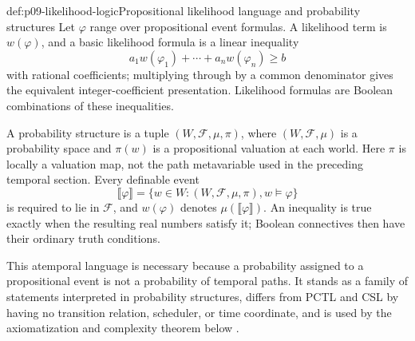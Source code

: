 \begin{hbdefinition}{def:p09-likelihood-logic}{Propositional likelihood language and probability structures}
Let \(\varphi\) range over propositional event formulas.  A likelihood term is
\(w(\varphi)\), and a basic likelihood formula is a linear inequality
\[
 a_1w(\varphi_1)+\cdots+a_nw(\varphi_n)\geq b
\]
with rational coefficients; multiplying through by a common denominator gives
the equivalent integer-coefficient presentation.  Likelihood formulas are
Boolean combinations of these inequalities.

A probability structure is a tuple \((W,\mathcal F,\mu,\pi)\), where
\((W,\mathcal F,\mu)\) is a probability space and \(\pi(w)\) is a
propositional valuation at each world.  Here \(\pi\) is locally a valuation
map, not the path metavariable used in the preceding temporal section.  Every
definable event
\[
 \llbracket\varphi\rrbracket
   =\{w\in W:(W,\mathcal F,\mu,\pi),w\models\varphi\}
\]
is required to lie in \(\mathcal F\), and
\(w(\varphi)\) denotes \(\mu(\llbracket\varphi\rrbracket)\).  An inequality is
true exactly when the resulting real numbers satisfy it; Boolean connectives
then have their ordinary truth conditions.

This atemporal language is necessary because a probability assigned to a
propositional event is not a probability of temporal paths.  It stands as a
family of statements interpreted in probability structures, differs from
PCTL and CSL by having no transition relation, scheduler, or time coordinate,
and is used by the axiomatization and complexity theorem below
\cite{FaginHalpernMegiddo1990,Halpern2003}.
\end{hbdefinition}

